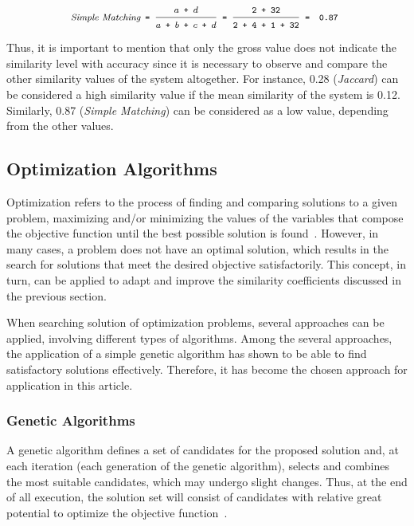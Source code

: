 \documentclass[smallextended,natbib]{svjour3}
\begin{document}
{\begin{equation}
\label{eq:simSM}
\footnotesize
\textit{Simple Matching} \texttt{ = } \frac{\texttt{$a$} \texttt{ + } \texttt{$d$}}{\texttt{$a$} \texttt{ + } \texttt{$b$} \texttt{ + } \texttt{$c$} \texttt{ + } \texttt{$d$}} \texttt{ = } \frac{\texttt{2} \texttt{ + } \texttt{32}}{\texttt{2} \texttt{ + } \texttt{4} \texttt{ + } \texttt{1} \texttt{ + } \texttt{32}} \texttt{ = } \texttt{ 0.87 }
\\[0.15cm]
\end{equation}

Thus, it is important to mention that only the gross value does not indicate the similarity level with accuracy since it is necessary to observe and compare the other similarity values of the system altogether. For instance, 0.28 (\textit{Jaccard}) can be considered a high similarity value if the mean similarity of the system is 0.12. Similarly, 0.87 (\textit{Simple Matching}) can be considered as a low value, depending from the other values.

\subsection{Optimization Algorithms}
\label{sec:algooti}

Optimization refers to the process of finding and comparing solutions to a given problem, maximizing and/or minimizing the values of the variables that compose the objective function until the best possible solution is found~\citep{livrooptimi}. However, in many cases, a problem does not have an optimal solution, which results in the search for solutions that meet the desired objective satisfactorily. This concept, in turn, can be applied to adapt and improve the similarity coefficients discussed in the previous section.

When searching solution of optimization problems, several approaches can be applied, involving different types of algorithms. Among the several approaches, the application of a simple genetic algorithm has shown to be able to find satisfactory solutions effectively. Therefore, it has become the chosen approach for application in this article.

\subsubsection{Genetic Algorithms}
\label{sec:algogen}

A genetic algorithm defines a set of candidates for the proposed solution and, at each iteration (each generation of the genetic algorithm), selects and combines the most suitable candidates, which may undergo slight changes. Thus, at the end of all execution, the solution set will consist of candidates with relative great potential to optimize the objective function~\citep{algogen}. 

}
\end{document}
